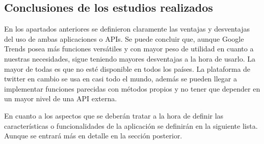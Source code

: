 \subsection{Conclusiones de los estudios realizados}

En los apartados anteriores se definieron claramente las ventajas y desventajas del uso de ambas aplicaciones o APIs. Se puede concluir que, aunque Google Trends posea más funciones versátiles y con mayor peso de utilidad en cuanto a nuestras necesidades, sigue teniendo mayores desventajas a la hora de usarlo. La mayor de todas es que no esté disponible en todos los países. La plataforma de twitter en cambio se usa en casi todo el mundo, además se pueden llegar a implementar funciones parecidas con métodos propios y no tener que depender en un mayor nivel de una API externa.

\vspace{0.3cm}

En cuanto a los aspectos que se deberán tratar a la hora de definir las características o funcionalidades de la aplicación se definirán en la siguiente lista. Aunque se entrará más en detalle en la sección posterior.

